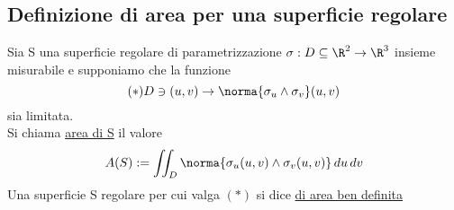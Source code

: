 \subsection{Definizione di area per una superficie regolare}
\begin{definition}
  Sia S una superficie regolare di parametrizzazione $\sigma : D\subseteq \R^2 \to \R^3$
  insieme misurabile e supponiamo che la funzione 
  $$(*) D \ni (u,v) \to \norma{\sigma_u\wedge\sigma_v}(u,v)$$
  sia limitata. \\
  Si chiama \underline{area di S} il valore 
  $$A(S) := \iint_D \norma{\sigma_u(u,v)\wedge\sigma_v(u,v)}\,du\,dv$$
  Una superficie S regolare per cui valga $(*)$ si dice \underline{di area ben definita}
\end{definition}